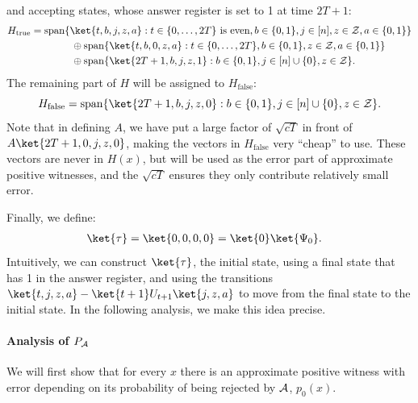 \documentclass[11pt]{article}
\numberwithin{equation}{section}
\theoremstyle{definition}
\theoremstyle{plain}
\begin{document}
and accepting states, whose answer register is set to 1 at time $2T+1$:
\begin{align*}
H_{\mathrm{true}} &= \mathrm{span}\{\ket{t,b,j,z,a}:t\in\{0,\dots,2T\}\mbox{ is even},b\in\{0,1\}, j\in[n], z\in{\cal Z},a\in\{0,1\}\}\\
&\qquad\qquad \oplus \mathrm{span}\{\ket{t,b,0,z,a}:t\in\{0,\dots,2T\}, b\in \{0,1\},z\in {\cal Z},a\in \{0,1\}\}\\
& \qquad\qquad \oplus \mathrm{span}\{\ket{2T+1,b,j,z,1}:b\in\{0,1\},j\in[n]\cup\{0\},z\in{\cal Z}\}.
\end{align*}
The remaining part of $H$ will be assigned to $H_{\mathrm{false}}$:
$$H_{\mathrm{false}}=\mathrm{span}\{\ket{2T+1,b,j,z,0}:b\in\{0,1\},j\in [n]\cup\{0\},z\in{\cal Z}\}.$$
Note that in defining $A$, we have put a large factor of $\sqrt{cT}$ in front of $A\ket{2T+1,0,j,z,0}$, making the vectors in $H_{\mathrm{false}}$ very ``cheap'' to use. These vectors are never in $H(x)$, but will be used as the error part of approximate positive witnesses, and the $\sqrt{cT}$ ensures they only contribute relatively small error. 

Finally, we define: 
\begin{align*}
\ket{\tau} &= \ket{0,0,0,0}=\ket{0}\ket{\Psi_0}.
\end{align*}
Intuitively, we can construct $\ket{\tau}$, the initial state, using a final state that has 1 in the answer register, and using the transitions $\ket{t,j,z,a}-\ket{t+1}U_{t+1}\ket{j,z,a}$ to move from the final state to the initial state. In the following analysis, we make this idea precise. 

\paragraph{Analysis of $P_{\cal A}$} We will first show that for every $x$ there is an approximate positive witness with error depending on its probability of being rejected by $\cal A$, $p_0(x)$.
\end{document}
